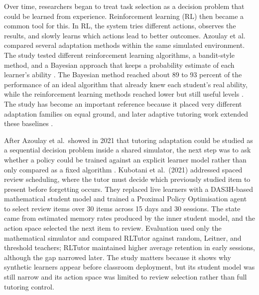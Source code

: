 Over time, researchers began to treat task selection as a decision problem that could be learned from experience. Reinforcement learning (RL) then became a common tool for this. In RL, the system tries different actions, observes the results, and slowly learns which actions lead to better outcomes. Azoulay et al. compared several adaptation methods within the same simulated environment. The study tested different reinforcement learning algorithms, a bandit-style method, and a Bayesian approach that keeps a probability estimate of each learner's ability \cite{azoulay_adaptive_2021}. The Bayesian method reached about 89 to 93 percent of the performance of an ideal algorithm that already knew each student's real ability, while the reinforcement learning methods reached lower but still useful levels \cite{azoulay_adaptive_2021}. The study has become an important reference because it placed very different adaptation families on equal ground, and later adaptive tutoring work extended these baselines \cite{kubotani_rltutor_2021,fu_integrating_2025}.

After Azoulay et al.\ showed in 2021 that tutoring adaptation could be studied as a sequential decision problem inside a shared simulator, the next step was to ask whether a policy could be trained against an explicit learner model rather than only compared as a fixed algorithm \cite{azoulay_adaptive_2021,kubotani_rltutor_2021}. Kubotani et al.\ (2021) addressed spaced review scheduling, where the tutor must decide which previously studied item to present before forgetting occurs. They replaced live learners with a DAS3H-based mathematical student model and trained a Proximal Policy Optimisation agent to select review items over 30 items across 15 days and 30 sessions. The state came from estimated memory rates produced by the inner student model, and the action space selected the next item to review. Evaluation used only the mathematical simulator and compared RLTutor against random, Leitner, and threshold teachers; RLTutor maintained higher average retention in early sessions, although the gap narrowed later. The study matters because it shows why synthetic learners appear before classroom deployment, but its student model was still narrow and its action space was limited to review selection rather than full tutoring control.

